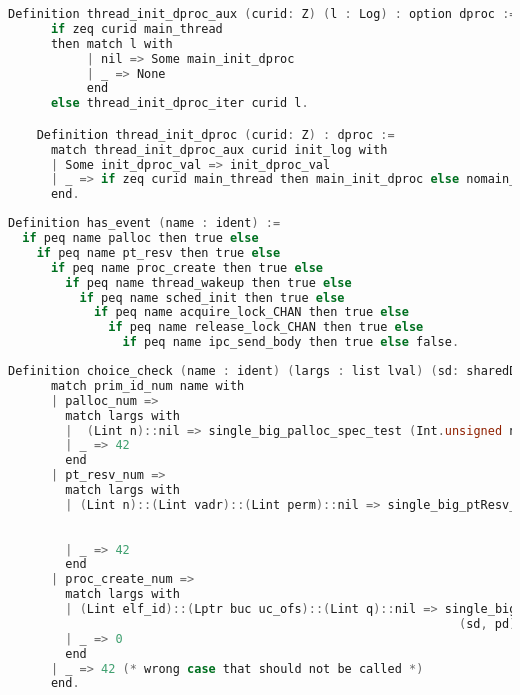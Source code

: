 \begin{lstlisting}[language=C]
    Definition thread_init_dproc_aux (curid: Z) (l : Log) : option dproc :=
      if zeq curid main_thread 
      then match l with 
           | nil => Some main_init_dproc 
           | _ => None
           end
      else thread_init_dproc_iter curid l.

    Definition thread_init_dproc (curid: Z) : dproc :=
      match thread_init_dproc_aux curid init_log with
      | Some init_dproc_val => init_dproc_val
      | _ => if zeq curid main_thread then main_init_dproc else nomain_init_priv_adt
      end.
\end{lstlisting}

\begin{lstlisting}[language=C]
Definition has_event (name : ident) :=
  if peq name palloc then true else 
    if peq name pt_resv then true else
      if peq name proc_create then true else
        if peq name thread_wakeup then true else
          if peq name sched_init then true else
            if peq name acquire_lock_CHAN then true else
              if peq name release_lock_CHAN then true else
                if peq name ipc_send_body then true else false.
\end{lstlisting}

\begin{lstlisting}[language=C]
    Definition choice_check (name : ident) (largs : list lval) (sd: sharedData) (pd: privData) : Z :=
      match prim_id_num name with 
      | palloc_num =>
        match largs with 
        |  (Lint n)::nil => single_big_palloc_spec_test (Int.unsigned n) (sd, pd)
        | _ => 42
        end
      | pt_resv_num => 
        match largs with 
        | (Lint n)::(Lint vadr)::(Lint perm)::nil => single_big_ptResv_spec_test (Int.unsigned n) 
                                                                                 (Int.unsigned vadr)
                                                                                 (Int.unsigned perm) (sd, pd)
        | _ => 42
        end
      | proc_create_num =>
        match largs with 
        | (Lint elf_id)::(Lptr buc uc_ofs)::(Lint q)::nil => single_big_proc_create_spec_test 
                                                               (sd, pd) buc uc_ofs (Int.unsigned q)
        | _ => 0
        end
      | _ => 42 (* wrong case that should not be called *)
      end.
\end{lstlisting}

